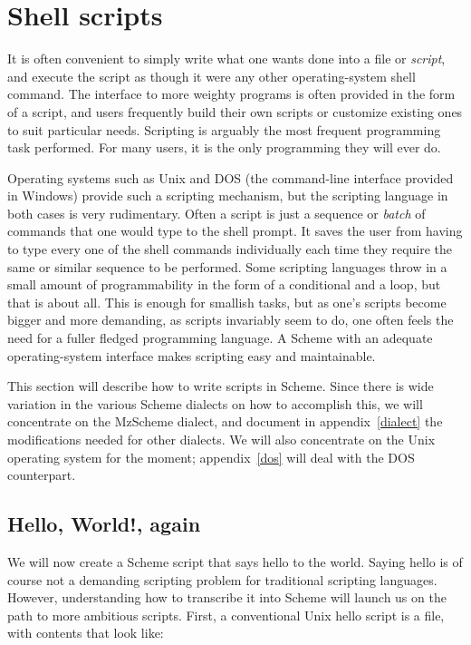 \chapter{Shell scripts}
\label{script}

It is often convenient to simply write what one wants
done into a file or {\em script}, and execute the
script as though it were any other operating-system
shell command.  The interface to more weighty programs
is often provided in the form of a script, and users
frequently build their own scripts or customize
existing ones to suit particular needs.  Scripting is
arguably the most frequent programming task performed.
For many users, it is the only programming they will
ever do.

Operating systems such as Unix and DOS (the
command-line interface provided in Windows)
provide such a scripting mechanism, but the scripting
language in both cases is very rudimentary.  Often a
script is just a sequence or {\em batch} of commands
that one would type to the shell prompt.  It saves the
user from having to type every one of the shell
commands individually each time they require the same
or similar sequence to be performed.  Some scripting
languages throw in a small amount of programmability in
the form of a conditional and a loop, but that is about
all.  This is enough for smallish tasks, but as one’s
scripts become bigger and more demanding, as scripts
invariably seem to do, one often feels the need for a
fuller fledged programming language.  A Scheme with an
adequate operating-system interface makes scripting
easy and maintainable.

This section will describe how to write scripts in
Scheme.  Since there is wide variation in the various
Scheme dialects on how to accomplish this, we will
concentrate on the MzScheme dialect, and document in
appendix~\ref{dialect} the modifications needed for
other dialects.  We will also concentrate on the Unix
operating system for the moment; appendix~\ref{dos}
will deal with the DOS counterpart.

\section{Hello, World!, again}

We will now create a Scheme script that says hello to
the world.  Saying hello is of course not a demanding
scripting problem for traditional scripting languages.
However, understanding how to transcribe it into Scheme
will launch us on the path to more ambitious scripts.
First, a conventional Unix hello script is a file, with
contents that look like:

